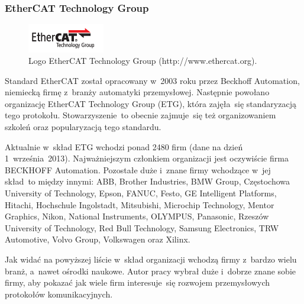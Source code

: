 \subsubsection{EtherCAT Technology Group}
\begin{figure}[!htb] 	\centering 	\includegraphics[width=0.3\textwidth]{images/logoETG} \caption{Logo EtherCAT Technology Group (http://www.ethercat.org).} \label{logoETG} \end{figure}

Standard EtherCAT został opracowany w~2003 roku przez Beckhoff Automation, niemiecką firmę z~branży automatyki przemysłowej. Następnie powołano organizację EtherCAT Technology Group (ETG), która zajęła~się standaryzacją tego protokołu. Stowarzyszenie~to obecnie zajmuje~się też organizowaniem szkoleń oraz popularyzacją tego standardu. 

Aktualnie w~skład ETG wchodzi ponad 2480 firm (dane na dzień 1~września~2013). Najważniejszym członkiem organizacji jest oczywiście firma BECKHOFF Automation. Pozostałe duże i~znane firmy wchodzące w~jej skład~to między innymi: ABB, Brother Industries, BMW Group, Częstochowa University of Technology, Epson, FANUC, Festo, GE Intelligent Platforms, Hitachi, Hochschule Ingolstadt, Mitsubishi, Microchip Technology, Mentor Graphics, Nikon, National Instruments, OLYMPUS, Panasonic, Rzeszów University of Technology, Red Bull Technology, Samsung Electronics, TRW Automotive, Volvo Group, Volkswagen oraz Xilinx.

Jak widać na powyższej liście w~skład organizacji wchodzą firmy z~bardzo wielu branż, a~nawet ośrodki naukowe. Autor pracy wybrał duże i~dobrze znane sobie firmy, aby pokazać jak wiele firm interesuje~się rozwojem przemysłowych protokołów komunikacyjnych.

